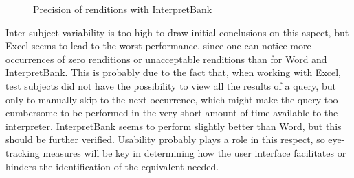 \documentclass[output=paper]{langsci/langscibook}
\begin{document}
\begin{figure}[p]
\caption{Precision of renditions with InterpretBank \label{fig:prandi:14}}
\end{figure}

Inter-subject variability is too high to draw initial conclusions on this aspect, but Excel seems to lead to the worst performance, since one can notice more occurrences of zero renditions or unacceptable renditions than for Word and InterpretBank. This is probably due to the fact that, when working with Excel, test subjects did not have the possibility to view all the results of a query, but only to manually skip to the next occurrence, which might make the query too cumbersome to be performed in the very short amount of time available to the interpreter. InterpretBank seems to perform slightly better than Word, but this should be further verified. Usability probably plays a role in this respect, so eye-tracking measures will be key in determining how the user interface facilitates or hinders the identification of the equivalent needed.
\end{document}

